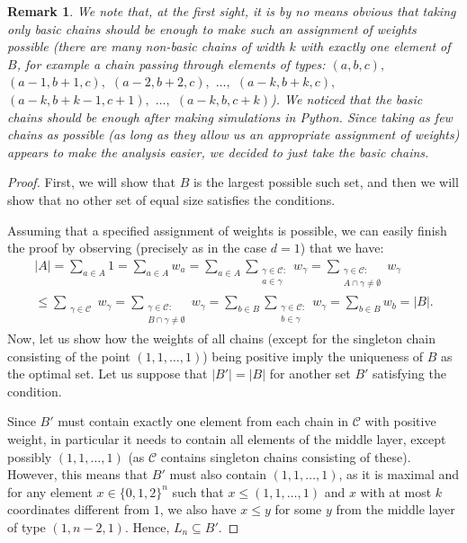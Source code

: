 \documentclass[11pt, reqno]{amsart}
\newtheorem*{remark}{Remark}
\numberwithin{equation}{section}
\newcommand{\cube}{\{0, 1, 2\}^n}
\begin{document}
\begin{remark}
    We note that, at the first sight, it is by no means obvious that taking only basic chains should be enough to make such an assignment of weights possible (there are many non-basic chains of width $k$ with exactly one element of $B$, for example a chain passing through elements of types: $(a, b, c),$ $(a-1, b+1, c),$ $(a-2, b+2, c),$ $\dots,$ $(a-k, b+k, c),$ $(a-k, b+k-1, c+1),$ $\dots,$ $(a-k, b, c+k)$). We noticed that the basic chains should be enough after making simulations in Python. Since taking as few chains as possible (as long as they allow us an appropriate assignment of weights) appears to make the analysis easier, we decided to just take the basic chains.
\end{remark}

\begin{proof}
    First, we will show that $B$ is the largest possible such set, and then we will show that no other set of equal size satisfies the conditions.

    Assuming that a specified assignment of weights is possible, we can easily finish the proof by observing (precisely as in the case $d=1$) that we have:
    \begin{multline}
        |A| = \sum_{a \in A} 1 = \sum_{a \in A} w_a = \sum_{a \in A} \sum_{\substack{\gamma \in \mathcal{C}: \\ a \in \gamma}} w_{\gamma} = \sum_{\substack{\gamma \in \mathcal{C}: \\ A \cap \gamma \neq \emptyset}} w_{\gamma} \\ \leqslant \sum_{\substack{\gamma \in \mathcal{C}}} w_{\gamma} = \sum_{\substack{\gamma \in \mathcal{C}: \\ B \cap \gamma \neq \emptyset}} w_{\gamma} = \sum_{b \in B} \sum_{\substack{\gamma \in \mathcal{C}: \\ b \in \gamma}} w_{\gamma} = \sum_{b \in B} w_b = |B|.
    \end{multline}
    Now, let us show how the weights of all chains (except for the singleton chain consisting of the point $(1, 1, \dots, 1)$) being positive imply the uniqueness of $B$ as the optimal set. Let us suppose that $|B'|=|B|$ for another set $B'$ satisfying the condition.
    
    Since $B'$ must contain exactly one element from each chain in $\mathcal{C}$ with positive weight, in particular it needs to contain all elements of the middle layer, except possibly $(1, 1, \dots, 1)$ (as $\mathcal{C}$ contains singleton chains consisting of these). However, this means that $B'$ must also contain $(1, 1, \dots, 1)$, as it is maximal and for any element $x \in \cube$ such that $x \leqslant (1, 1, \dots, 1)$ and $x$ with at most $k$ coordinates different from $1$, we also have $x \leqslant y$ for some $y$ from the middle layer of type $(1, n-2, 1)$. Hence, $L_n \subseteq B'$.
    

\end{proof}
\end{document}
